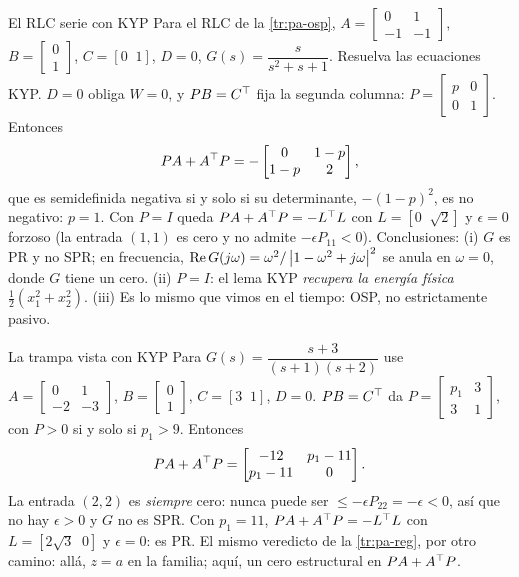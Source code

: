 \begin{ejemplo}[label=ej:pa-kyprlc]{El RLC serie con KYP}
Para el RLC de la \cref{tr:pa-osp}, $A=\begin{bmatrix}0&1\\-1&-1\end{bmatrix}$, $B=\begin{bmatrix}0\\1\end{bmatrix}$, $C=[0\;\;1]$, $D=0$, $G(s)=\dfrac{s}{s^2+s+1}$. Resuelva las ecuaciones KYP.
\solucion $D=0$ obliga $W=0$, y $PB=C^{\top}$ fija la segunda columna: $P=\begin{bmatrix}p&0\\0&1\end{bmatrix}$. Entonces
\[
  PA+A^{\top} P=-\begin{bmatrix}0&1-p\\1-p&2\end{bmatrix},
\]
que es semidefinida negativa si y solo si su determinante, $-(1-p)^2$, es no negativo: $p=1$. Con $P=I$ queda $PA+A^{\top} P=-L^{\top} L$ con $L=[0\;\;\sqrt2]$ y $\epsilon=0$ forzoso (la entrada $(1,1)$ es cero y no admite $-\epsilon P_{11}<0$). Conclusiones: (i) $G$ es PR y no SPR; en frecuencia, $\operatorname{Re} G(j\omega)=\omega^2/\left\lvert 1-\omega^2+j\omega\right\rvert^2$ se anula en $\omega=0$, donde $G$ tiene un cero. (ii) $P=I$: el lema KYP \emph{recupera la energía física} $\tfrac12(x_1^2+x_2^2)$. (iii) Es lo mismo que vimos en el tiempo: OSP, no estrictamente pasivo.
\end{ejemplo}

\begin{ejemplo}[label=ej:pa-kyps3]{La trampa vista con KYP}
Para $G(s)=\dfrac{s+3}{(s+1)(s+2)}$ use $A=\begin{bmatrix}0&1\\-2&-3\end{bmatrix}$, $B=\begin{bmatrix}0\\1\end{bmatrix}$, $C=[3\;\;1]$, $D=0$.
\solucion $PB=C^{\top}$ da $P=\begin{bmatrix}p_1&3\\3&1\end{bmatrix}$, con $P>0$ si y solo si $p_1>9$. Entonces
\[
  PA+A^{\top} P=\begin{bmatrix}-12&p_1-11\\p_1-11&0\end{bmatrix}.
\]
La entrada $(2,2)$ es \emph{siempre} cero: nunca puede ser $\le-\epsilon P_{22}=-\epsilon<0$, así que no hay $\epsilon>0$ y $G$ no es SPR. Con $p_1=11$, $PA+A^{\top} P=-L^{\top} L$ con $L=[2\sqrt3\;\;0]$ y $\epsilon=0$: es PR. El mismo veredicto de la \cref{tr:pa-reg}, por otro camino: allá, $z=a$ en la familia; aquí, un cero estructural en $PA+A^{\top} P$.
\end{ejemplo}

